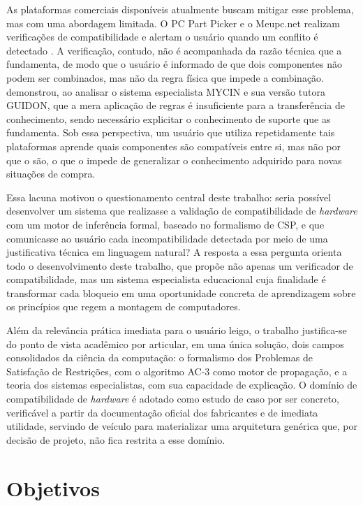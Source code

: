 As plataformas comerciais disponíveis atualmente buscam mitigar esse problema, mas com
uma abordagem limitada. O PC Part Picker e o Meupc.net realizam verificações de
compatibilidade e alertam o usuário quando um conflito é detectado \cite{PCPARTPICKER2024, MEUPC2024}.
A verificação, contudo, não é acompanhada da razão técnica que a fundamenta, de modo que
o usuário é informado de que dois componentes não podem ser combinados, mas não da regra
física que impede a combinação. \textcite{Clancey1983} demonstrou, ao analisar o sistema
especialista MYCIN e sua versão tutora GUIDON, que a mera aplicação de regras é insuficiente
para a transferência de conhecimento, sendo necessário explicitar o conhecimento de suporte
que as fundamenta. Sob essa perspectiva, um usuário que utiliza repetidamente tais
plataformas aprende quais componentes são compatíveis entre si, mas não por que o são, o
que o impede de generalizar o conhecimento adquirido para novas situações de compra.

Essa lacuna motivou o questionamento central deste trabalho: seria possível desenvolver um sistema que realizasse a validação de compatibilidade
de \textit{hardware} com um motor de inferência formal, baseado no formalismo de CSP, e que comunicasse ao usuário cada incompatibilidade
detectada por meio de uma justificativa técnica em linguagem natural? A resposta a essa pergunta orienta todo o desenvolvimento deste trabalho,
que propõe não apenas um verificador de compatibilidade, mas um sistema especialista educacional cuja finalidade é transformar cada bloqueio
em uma oportunidade concreta de aprendizagem sobre os princípios que regem a montagem de computadores.

Além da relevância prática imediata para o usuário leigo, o trabalho justifica-se do ponto de vista acadêmico por articular, em uma única
solução, dois campos consolidados da ciência da computação: o formalismo dos Problemas de Satisfação de Restrições, com o algoritmo AC-3 como
motor de propagação, e a teoria dos sistemas especialistas, com sua capacidade de explicação. O domínio de compatibilidade de \textit{hardware}
é adotado como estudo de caso por ser concreto, verificável a partir da documentação oficial dos fabricantes e de imediata utilidade,
servindo de veículo para materializar uma arquitetura genérica que, por decisão de projeto, não fica restrita a esse domínio.

\section{Objetivos}

